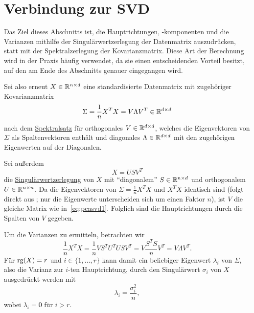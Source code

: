 \section{Verbindung zur SVD}

Das Ziel dieses Abschnitts ist, die Hauptrichtungen, -komponenten und die Varianzen mithilfe der Singulärwertzerlegung der Datenmatrix auszudrücken, statt mit der Spektralzerlegung der Kovarianzmatrix.
Diese Art der Berechnung wird in der Praxis häufig verwendet, da sie einen entscheidenden Vorteil besitzt, auf den am Ende des Abschnitts genauer eingegangen wird.

Sei also erneut \(X \in \mathbb{R}^{n \times d}\) eine standardisierte Datenmatrix mit zugehöriger Kovarianzmatrix
\begin{equation}
    \Sigma = \frac{1}{n}X^{T}X = V \Lambda V^{T} \in \mathbb{R}^{d \times d} \label{eq:pcasvd1}
\end{equation}
nach dem \hyperref[spec]{Spektralsatz} für orthogonales \(V \in \mathbb{R}^{d \times d}\), welches die Eigenvektoren von \(\Sigma\) als Spaltenvektoren enthält und diagonales \(\Lambda \in \mathbb{R}^{d \times d}\) mit den zugehörigen Eigenwerten auf der Diagonalen.

Sei außerdem
\begin{equation*}
    X = USV^{T}
\end{equation*}
die \hyperref[th:svd]{Singulärwertzerlegung} von \(X\) mit \enquote{diagonalem} \(S \in \mathbb{R}^{n \times d}\) und orthogonalem \(U \in \mathbb{R}^{n \times n}\).
Da die Eigenvektoren von \(\Sigma = \frac{1}{n}X^{T}X\) und \(X^{T}X\) identisch sind (folgt direkt aus ; nur die Eigenwerte unterscheiden sich um einen Faktor \(n\)), ist \(V\) die gleiche Matrix wie in~\eqref{eq:pcasvd1}. 
Folglich sind die Hauptrichtungen durch die Spalten von \(V\) gegeben.  

Um die Varianzen zu ermitteln, betrachten wir
\begin{equation*}
    \frac{1}{n}X^{T}X = \frac{1}{n}VS^{T}U^{T}USV^{T} = V\frac{S^{T}S}{n}V^{T} = V\Lambda V^{T}.
\end{equation*} 
Für \(\operatorname{rg}(X) = r\) und \(i \in \{1,\ldots,r\}\) kann damit ein beliebiger Eigenwert \(\lambda_{i}\) von \(\Sigma\), also die Varianz zur \(i\)-ten Hauptrichtung, durch den Singulärwert \(\sigma_{i}\) von \(X\) ausgedrückt werden mit
\begin{equation*}
    \lambda_{i} = \frac{\sigma_{i}^{2}}{n}, 
\end{equation*}  
wobei \(\lambda_{i} = 0\) für \(i > r\).

